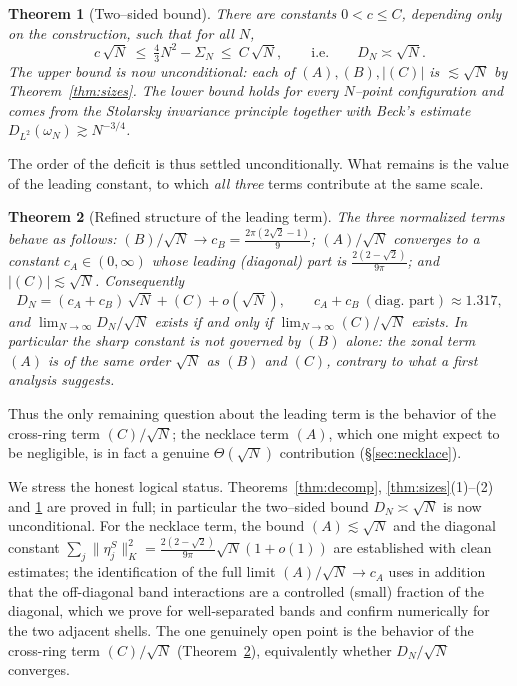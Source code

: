 \documentclass[11pt,reqno]{amsart}
\newtheorem{theorem}{Theorem}[section]
\theoremstyle{definition}
\newcommand{\abs}[1]{\lvert #1\rvert}
\newcommand{\Def}{D_N}
\newcommand{\Sig}{\Sigma_N}
\begin{document}
\begin{theorem}[Two--sided bound]\label{thm:main}
There are constants $0<c\le C$, depending only on the construction, such that for all $N$,
\[
   c\,\sqrt N\ \le\ \tfrac43N^2-\Sig\ \le\ C\,\sqrt N ,
   \qquad\text{i.e.}\qquad \Def\asymp\sqrt N .
\]
The upper bound is now unconditional: each of $(A),(B),\abs{(C)}$ is $\lesssim\sqrt N$ by
Theorem~\ref{thm:sizes}. The lower bound holds for \emph{every} $N$--point configuration and comes
from the Stolarsky invariance principle together with Beck's estimate
$D_{L^2}(\omega_N)\gtrsim N^{-3/4}$.
\end{theorem}

The order of the deficit is thus settled unconditionally. What remains is the value of the leading
constant, to which \emph{all three} terms contribute at the same scale.

\begin{theorem}[Refined structure of the leading term]\label{thm:sharp}
The three normalized terms behave as follows: $(B)/\sqrt N\to c_B=\frac{2\pi(2\sqrt2-1)}{9}$;
$(A)/\sqrt N$ converges to a constant $c_A\in(0,\infty)$ whose leading (diagonal) part is
$\frac{2(2-\sqrt2)}{9\pi}$; and $\abs{(C)}\lesssim\sqrt N$. Consequently
\[
   \Def=(c_A+c_B)\,\sqrt N+(C)+o(\sqrt N),\qquad c_A+c_B\ (\text{diag.\ part})\approx1.317,
\]
and $\lim_{N\to\infty}\Def/\sqrt N$ exists if and only if $\lim_{N\to\infty}(C)/\sqrt N$ exists. In
particular the sharp constant is \emph{not} governed by $(B)$ alone: the zonal term $(A)$ is of the
same order $\sqrt N$ as $(B)$ and $(C)$, contrary to what a first analysis suggests.
\end{theorem}

Thus the only remaining question about the leading term is the behavior of the cross-ring term
$(C)/\sqrt N$; the necklace term $(A)$, which one might expect to be negligible, is in fact a genuine
$\Theta(\sqrt N)$ contribution (\S\ref{sec:necklace}).

We stress the honest logical status. Theorems~\ref{thm:decomp}, \ref{thm:sizes}(1)--(2) and
\ref{thm:main} are proved in full; in particular the two--sided bound $\Def\asymp\sqrt N$ is now
unconditional. For the necklace term, the bound $(A)\lesssim\sqrt N$ and the diagonal constant
$\sum_j\lVert\eta_j^S\rVert_K^2=\frac{2(2-\sqrt2)}{9\pi}\sqrt N(1+o(1))$ are established with clean
estimates; the identification of the full limit $(A)/\sqrt N\to c_A$ uses in addition that the
off-diagonal band interactions are a controlled (small) fraction of the diagonal, which we prove for
well-separated bands and confirm numerically for the two adjacent shells. The one genuinely open
point is the behavior of the cross-ring term $(C)/\sqrt N$ (Theorem~\ref{thm:sharp}), equivalently
whether $\Def/\sqrt N$ converges.
\end{document}

